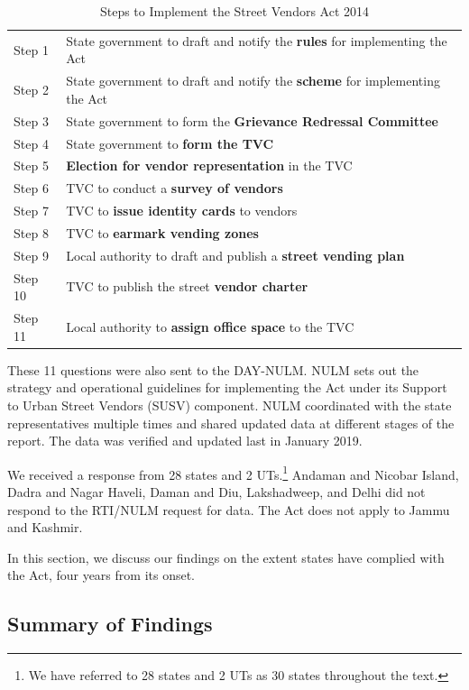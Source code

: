 \documentclass[a4paper, 12pt, twoside, table]{article}
\begin{document}
{%
\begin{table}[htpb]
\caption{Steps to Implement the Street Vendors Act 2014}
\label{tab: SVACsteps}
\begin{tabular}{ l  l } %
\toprule
Step 1	&	State government to draft and notify the \textbf{rules} for implementing the Act\\
Step 2 	&	State government to draft and notify the \textbf{scheme} for implementing the Act\\
Step 3	&	State government to form the \textbf{Grievance Redressal Committee}\\
Step 4	&	State government to \textbf{form the TVC}\\
Step 5	&	\textbf{Election for vendor representation} in the TVC\\
Step 6	&	TVC to conduct a \textbf{survey of vendors}\\
Step 7	&	TVC to \textbf{issue identity cards} to vendors\\
Step 8	&	TVC to \textbf{earmark vending zones}\\
Step 9 	&	Local authority to draft and publish a \textbf{street vending plan}\\
Step 10	&	TVC to publish the street \textbf{vendor charter}\\
Step 11	&	Local authority to \textbf{assign office space} to the TVC\\
\bottomrule
\end{tabular}
\end{table} 

These 11 questions were also sent to the DAY-NULM. NULM sets out the strategy and operational guidelines for implementing the Act under its Support to Urban Street Vendors (SUSV) component. NULM coordinated with the state representatives multiple times and shared updated data at different stages of the report. The data was verified and updated last in January 2019.

	We received a response from 28 states and 2 UTs.\footnote{ We have referred to 28 states and 2 UTs as 30 states throughout the text.} Andaman and Nicobar Island, Dadra and Nagar Haveli, Daman and Diu, Lakshadweep, and Delhi did not respond to the RTI/NULM request for data. The Act does not apply to Jammu and Kashmir. 

	In this section, we discuss our findings on the extent states have complied with the Act, four years from its onset.

\subsection*{Summary of Findings}

}
\end{document}
